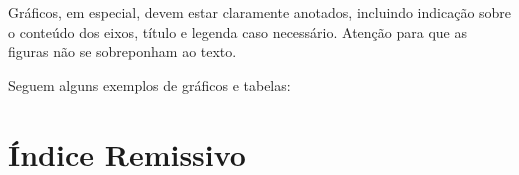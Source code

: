 \documentclass[12pt,a4paper]{report}
\begin{document}
Gráficos, em especial, devem estar claramente anotados, incluindo indicação sobre o conteúdo dos eixos, título e legenda caso necessário. Atenção para que as figuras não se sobreponham ao texto.

Seguem alguns exemplos de gráficos e tabelas:

\section*{Índice Remissivo}
\end{document}
